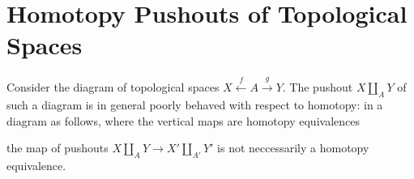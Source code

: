\documentclass{scrartcl}
\theoremstyle{plain}
\theoremstyle{definition}
\DeclareMathOperator{\cone}{cone}
\let\xto\xrightarrow
\let\xfrom\xleftarrow
\DeclareMathOperator{\id}{id}
\DeclareMathOperator{\BC}{B}
\renewcommand{\coprod}{\mathbin{\amalg}}
\begin{document}






\section{Homotopy Pushouts of Topological Spaces}\label{sec:homotopy-pushouts-spaces}

Consider the diagram of topological spaces $X \xfrom{f} A \xto{g} Y$. The pushout $X\coprod_A Y$ of such a diagram is in general poorly behaved with respect to homotopy: in a diagram as follows, where the vertical maps are homotopy equivalences

\begin{center}
\end{center}
the map of pushouts $X\coprod_A Y \to X'\coprod_{A'} Y'$ is not neccessarily a homotopy equivalence. 
\end{document}
